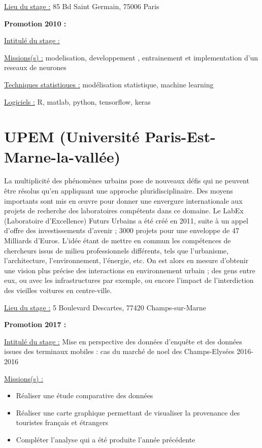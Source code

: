 \documentclass[
  letterpaper,
  DIV=11,
  numbers=noendperiod]{scrreprt}
\begin{document}
\uline{Lieu du stage :} 85 Bd Saint Germain, 75006 Paris

\textbf{Promotion 2010 :}

\uline{Intitulé du stage :}

\uline{Missions(s) :} modelisation, developpement , entrainement et
implementation d'un reseaux de neurones

\uline{Techniques statistiques :} modélisation statistique, machine
learning

\uline{Logiciels :} R, matlab, python, tensorflow, keras

\hypertarget{upem-universituxe9-paris-est-marne-la-valluxe9e}{%
\section{\texorpdfstring{\textbf{UPEM (Université
Paris-Est-Marne-la-vallée)}}{UPEM (Université Paris-Est-Marne-la-vallée)}}\label{upem-universituxe9-paris-est-marne-la-valluxe9e}}

La multiplicité des phénomènes urbains pose de nouveaux défis qui ne
peuvent être résolus qu'en appliquant une approche pluridisciplinaire.
Des moyens importants sont mis en œuvre pour donner une envergure
internationale aux projets de recherche des laboratoires compétents dans
ce domaine. Le LabEx (Laboratoire d'Excellence) Futurs Urbains a été
créé en 2011, suite à un appel d'offre des investissements d'avenir ;
3000 projets pour une enveloppe de 47 Milliards d'Euros. L'idée étant de
mettre en commun les compétences de chercheurs issus de milieu
professionnels différents, tels que l'urbanisme, l'architecture,
l'environnement, l'énergie, etc. On est alors en mesure d'obtenir une
vision plus précise des interactions en environnement urbain ; des gens
entre eux, ou avec les infrastructures par exemple, ou encore l'impact
de l'interdiction des vieilles voitures en centre-ville.

\uline{Lieu du stage :} 5 Boulevard Descartes, 77420 Champs-sur-Marne

\textbf{Promotion 2017 :}

\uline{Intitulé du stage :} Mise en perspective des données d'enquête et
des données issues des terminaux mobiles : cas du marché de noel des
Champs-Elysées 2016-2016

\uline{Missions(s) :}

\begin{itemize}
\item
  Réaliser une étude comparative des données
\item
  Réaliser une carte graphique permettant de visualiser la provenance
  des touristes français et étrangers
\item
  Compléter l'analyse qui a été produite l'année précédente
\end{itemize}
\end{document}
